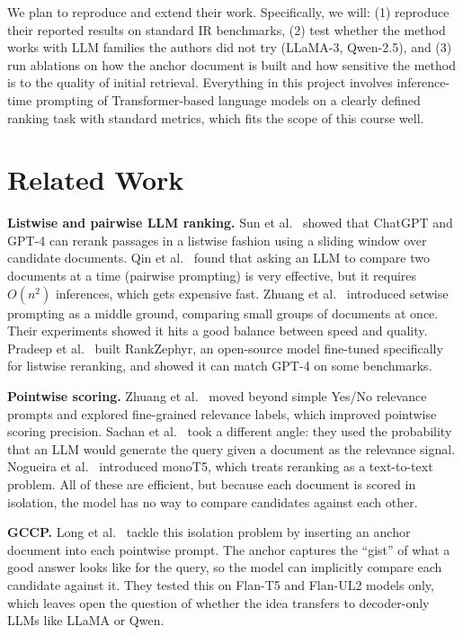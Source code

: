 \documentclass[conference]{IEEEtran}
\begin{document}
We plan to reproduce and extend their work. Specifically, we will: (1) reproduce their reported results on standard IR benchmarks, (2) test whether the method works with LLM families the authors did not try (LLaMA-3, Qwen-2.5), and (3) run ablations on how the anchor document is built and how sensitive the method is to the quality of initial retrieval. Everything in this project involves inference-time prompting of Transformer-based language models on a clearly defined ranking task with standard metrics, which fits the scope of this course well.

\section{Related Work}

\textbf{Listwise and pairwise LLM ranking.}
Sun et al.~\cite{sun2023chatgpt} showed that ChatGPT and GPT-4 can rerank passages in a listwise fashion using a sliding window over candidate documents. Qin et al.~\cite{qin2024pairwise} found that asking an LLM to compare two documents at a time (pairwise prompting) is very effective, but it requires $O(n^2)$ inferences, which gets expensive fast. Zhuang et al.~\cite{zhuang2024setwise} introduced setwise prompting as a middle ground, comparing small groups of documents at once. Their experiments showed it hits a good balance between speed and quality. Pradeep et al.~\cite{pradeep2023rankzephyr} built RankZephyr, an open-source model fine-tuned specifically for listwise reranking, and showed it can match GPT-4 on some benchmarks.

\textbf{Pointwise scoring.}
Zhuang et al.~\cite{zhuang2024beyond} moved beyond simple Yes/No relevance prompts and explored fine-grained relevance labels, which improved pointwise scoring precision. Sachan et al.~\cite{sachan2022improving} took a different angle: they used the probability that an LLM would generate the query given a document as the relevance signal. Nogueira et al.~\cite{nogueira2020document} introduced monoT5, which treats reranking as a text-to-text problem. All of these are efficient, but because each document is scored in isolation, the model has no way to compare candidates against each other.

\textbf{GCCP.}
Long et al.~\cite{long2025precise} tackle this isolation problem by inserting an anchor document into each pointwise prompt. The anchor captures the ``gist'' of what a good answer looks like for the query, so the model can implicitly compare each candidate against it. They tested this on Flan-T5 and Flan-UL2 models only, which leaves open the question of whether the idea transfers to decoder-only LLMs like LLaMA or Qwen.
\end{document}

